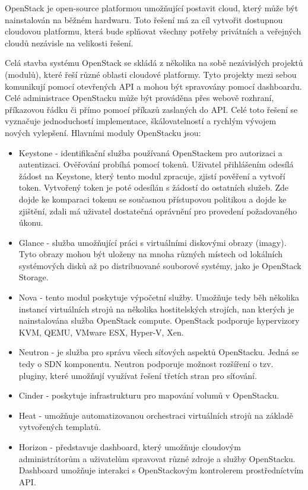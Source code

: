 OpenStack \cite{OpenStack_web} je open-source platformou umožňující postavit cloud, který může být nainstalován na běžném hardwaru. Toto řešení má za cíl vytvořit dostupnou cloudovou platformu, která bude splňovat všechny potřeby privátních a veřejných cloudů nezávisle na velikosti řešení.

Celá stavba systému OpenStack se skládá z několika na sobě nezávislých projektů (modulů), které řeší různé oblasti cloudové platformy. Tyto projekty mezi sebou komunikují pomocí otevřených API a mohou být spravovány pomocí dashboardu. Celé administrace OpenStacku může být prováděna přes webově rozhraní, příkazovou řádku či přímo pomocí příkazů zaslaných do API. Celé toto řešení se vyznačuje jednoduchostí implementace, škálovatelností a rychlým vývojem nových vylepšení. Hlavními moduly OpenStacku jsou:

\begin{itemize}
\item Keystone - identifikační služba používaná OpenStackem pro autorizaci a autentizaci. Ověřování probíhá pomocí tokenů. Uživatel přihlášením odesílá žádost na Keystone, který tento modul zpracuje, zjistí pověření a vytvoří token. Vytvořený token je poté odesílán s žádostí do ostatních služeb. Zde dojde ke komparaci tokenu se současnou přístupovou politikou a dojde ke zjištění, zdali má uživatel dostatečná oprávnění pro provedení požadovaného úkonu.
\item Glance - služba umožňující práci s virtuálními diskovými obrazy (imagy). Tyto obrazy mohou být uloženy na mnoha různých místech od lokálních systémových disků až po distribuované souborové systémy, jako je OpenStack Storage.
\item Nova - tento modul poskytuje výpočetní služby. Umožňuje tedy běh několika instancí virtuálních strojů na několika hostitelských strojích, nan kterých je nainstalována služba OpenStack compute. OpenStack podporuje hypervizory KVM, QEMU, VMware ESX, Hyper-V, Xen. 
\item Neutron - je služba pro správu všech síťových aspektů OpenStacku. Jedná se tedy o SDN komponentu. Neutron podporuje možnost rozšíření o tzv. pluginy, které umožňují využívat řešení třetích stran pro síťování.
\item Cinder - poskytuje infrastrukturu pro mapování volumů v OpenStacku.
\item Heat - umožňuje automatizovanou orchestraci virtuálních strojů na základě vytvořených templatů.
\item Horizon - představuje dashboard, který umožňuje cloudovým administrátorům a uživatelům spravovat různé zdroje a služby OpenStacku. Dashboard umožňuje interakci s OpenStackovým kontrolerem prostředníctvím API. 
\end{itemize}


